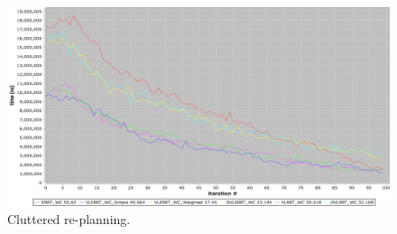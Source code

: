 \documentclass[10pt,twoside,twocolumn]{article}
\begin{document}
\begin{figure}[h]
\begin{center}
\includegraphics[scale=0.15]{cluttered_wc.png}
\end{center}
\caption{Cluttered re-planning.}
\label{replanning_cluttered}
\end{figure}
\end{document}
